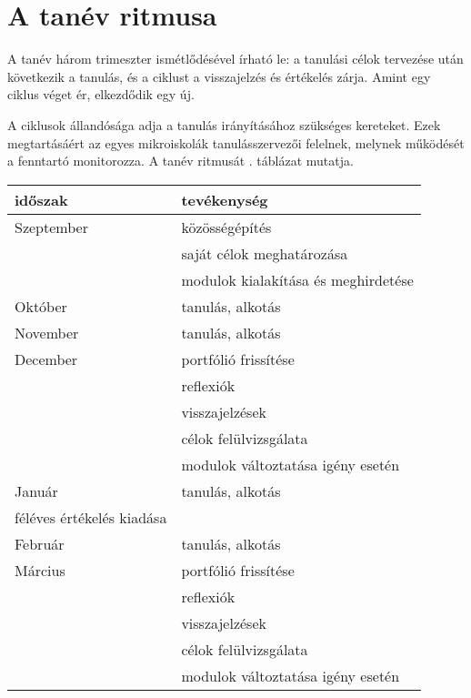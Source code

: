 \section{A tanév ritmusa}

A tanév három trimeszter ismétlődésével írható le: a tanulási célok
tervezése után következik a tanulás, és a ciklust a visszajelzés és értékelés
zárja.	Amint egy ciklus véget ér, elkezdődik egy új.

A ciklusok állandósága adja a tanulás irányításához szükséges kereteket. Ezek
megtartásáért az egyes mikroiskolák tanulásszervezői felelnek, melynek működését a
fenntartó monitorozza. A tanév ritmusát . táblázat
mutatja.

\begin{table}
  \centering
  \begin{tabular}{ l|l }
    \textbf{időszak} & \textbf{tevékenység}                \\
    \hline
    Szeptember       &
    közösségépítés                                         \\
                     & saját célok meghatározása           \\
                     & modulok kialakítása és meghirdetése
    \\ \hline

    Október          &
    tanulás, alkotás
    \\ \hline

    November         &
    tanulás, alkotás
    \\ \hline

    December         &
    portfólió frissítése                                   \\
                     & reflexiók                           \\
                     & visszajelzések                      \\
                     & célok felülvizsgálata               \\
                     & modulok változtatása igény esetén
    \\ \hline

    Január           &
    tanulás, alkotás\\
    féléves értékelés kiadása
    \\ \hline

    Február          &
    tanulás, alkotás
    \\ \hline

    Március          &
    portfólió frissítése                                   \\
                     & reflexiók                           \\
                     & visszajelzések                      \\
                     & célok felülvizsgálata               \\
                     & modulok változtatása igény esetén
    \\ \hline


\end{tabular}
\end{table}
